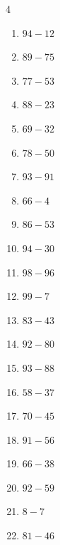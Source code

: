 \begin{multicols}{4}
\begin{enumerate}
  \item $94-12$
        \phantom{$=82$}

  \item $89-75$
        \phantom{$=14$}

  \item $77-53$
        \phantom{$=24$}

  \item $88-23$
        \phantom{$=65$}

  \item $69-32$
        \phantom{$=37$}

\columnbreak %

  \item $78-50$
        \phantom{$=28$}

  \item $93-91$
        \phantom{$=2$}

  \item $66-4$
        \phantom{$=62$}

  \item $86-53$
        \phantom{$=33$}

  \item $94-30$
        \phantom{$=64$}

  \item $98-96$
        \phantom{$=2$}

  \item $99-7$
        \phantom{$=92$}

  \item $83-43$
        \phantom{$=40$}

  \item $92-80$
        \phantom{$=12$}

  \item $93-88$
        \phantom{$=5$}

  \item $58-37$
        \phantom{$=21$}

  \item $70-45$
        \phantom{$=25$}

  \item $91-56$
        \phantom{$=35$}

  \item $66-38$
        \phantom{$=28$}

  \item $92-59$
        \phantom{$=33$}

  \item $8-7$
        \phantom{$=1$}

  \item $81-46$
        \phantom{$=35$}


\end{enumerate}
\end{multicols}
